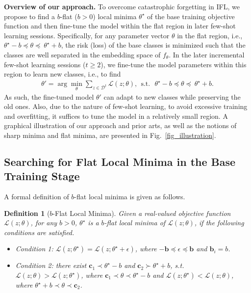 \documentclass{article}
\newtheorem{mydef}{Definition}
\begin{document}
\textbf{Overview of our approach.} 
To overcome catastrophic forgetting in IFL, we propose to find a $b$-flat ($b>0$) local minima $\theta^\star$ of the base training objective function and then fine-tune the model within the flat region in later few-shot learning sessions.
Specifically, for any parameter vector $\theta$ in the flat region, i.e., $\theta^\star-b  \preceq\theta\preceq\ \theta^\star+b$, the risk (loss) of the base classes is minimized such that the classes are well separated in the embedding space of $f_\theta$. In the later incremental few-shot learning sessions ($t\geq 2$), we fine-tune the model parameters within this region to learn new classes, i.e., to find 
\begin{align*}
    \theta' = \arg\min_\theta \sum_{z\in \mathcal{D}^t}\mathcal{L}(z;\theta),~~ \text{s.t.}~~\ \theta^\star-b  \preceq\theta\preceq\ \theta^\star+b.
\end{align*}
As such, the fine-tuned model $\theta'$ can adapt to new classes while preserving the old ones. Also, due to the nature of few-shot learning, to avoid excessive training and overfitting, it suffices to tune the model in a relatively small region. A graphical illustration of our approach and prior arts, as well as the notions of sharp minima and flat minima, are presented in Fig.~\ref{fig_illustration}. 

\subsection{Searching for Flat Local Minima in the Base Training Stage}

A formal definition of $b$-flat local minima is given as follows.

\begin{mydef}[$b$-Flat Local Minima]\label{def:minima}
Given a real-valued objective function $\mathcal{L}(z;\theta)$, for any $b>0$, $\theta^\star$ is a $b$-flat local minima of $\mathcal{L}(z;\theta)$, if the following conditions are satisfied.
\begin{itemize}
    \item Condition 1: 
    $\mathcal{L}(z;\theta^\star)=\mathcal{L}(z;\theta^\star+\epsilon)$, where $-\mathbf{b} \preceq\epsilon\preceq \mathbf{b}$ and $\mathbf{b}_i=b$. 
    \item Condition 2: 
    there exist $\mathbf{c}_1 \prec \theta^\star-{b}$ and $\mathbf{c}_2 \succ \theta^\star+{b}$, s.t. $\mathcal{L}(z;\theta)>\mathcal{L}(z;\theta^\star)$, where $\mathbf{c}_1 \prec \theta \prec \theta^\star-{b}$ and  $\mathcal{L}(z;\theta^\star)<\mathcal{L}(z;\theta)$, where $\theta^\star+{b} \prec\theta \prec \mathbf{c}_2$.
\end{itemize}

\end{mydef}
\end{document}
